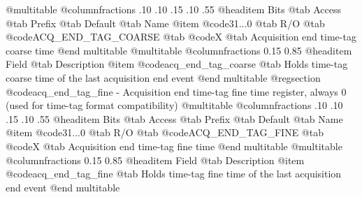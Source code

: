 @multitable @columnfractions .10 .10 .15 .10 .55
@headitem Bits @tab Access @tab Prefix @tab Default @tab Name
@item @code{31...0}
@tab R/O @tab
@code{ACQ_END_TAG_COARSE}
@tab @code{X} @tab 
Acquisition end time-tag coarse time
@end multitable
@multitable @columnfractions 0.15 0.85
@headitem Field @tab Description
@item @code{acq_end_tag_coarse} @tab Holds time-tag coarse time of the last acquisition end event
@end multitable
@regsection @code{acq_end_tag_fine} - Acquisition end time-tag fine time register, always 0 (used for time-tag format compatibility)
@multitable @columnfractions .10 .10 .15 .10 .55
@headitem Bits @tab Access @tab Prefix @tab Default @tab Name
@item @code{31...0}
@tab R/O @tab
@code{ACQ_END_TAG_FINE}
@tab @code{X} @tab 
Acquisition end time-tag fine time
@end multitable
@multitable @columnfractions 0.15 0.85
@headitem Field @tab Description
@item @code{acq_end_tag_fine} @tab Holds time-tag fine time of the last acquisition end event
@end multitable
